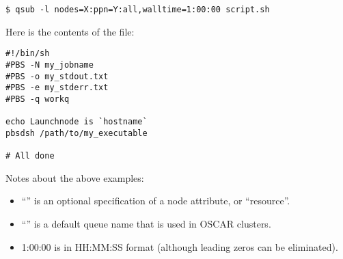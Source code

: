 \begin{verbatim}
$ qsub -l nodes=X:ppn=Y:all,walltime=1:00:00 script.sh
\end{verbatim}

Here is the contents of the  file:

\begin{verbatim}
#!/bin/sh
#PBS -N my_jobname
#PBS -o my_stdout.txt
#PBS -e my_stderr.txt
#PBS -q workq

echo Launchnode is `hostname`
pbsdsh /path/to/my_executable

# All done
\end{verbatim}

Notes about the above examples:
\begin{itemize} 
\item``'' is an optional specification of a node attribute,
  or ``resource''.
  
\item ``'' is a default queue name that is used in OSCAR
  clusters.
  
\item 1:00:00 is in HH:MM:SS format (although leading zeros can be
  eliminated).
\end{itemize}

